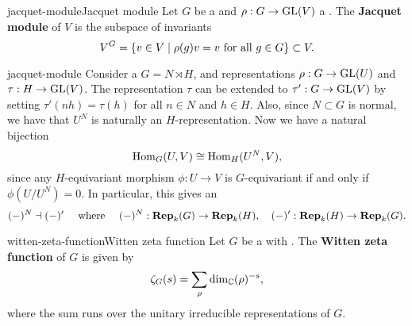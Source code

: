 \begin{topic}{jacquet-module}{Jacquet module}
    Let $G$ be a  and $\rho : G \to \textup{GL}(V)$ a . The \textbf{Jacquet module} of $V$ is the subspace of invariants
    \[ V^G = \{ v \in V \mid \rho(g) v = v \textup{ for all } g \in G \} \subset V . \]
\end{topic}

\begin{example}{jacquet-module}
    Consider a  $G = N \rtimes H$, and representations $\rho : G \to \textup{GL}(U)$ and $\tau : H \to \textup{GL}(V)$. The representation $\tau$ can be extended to $\tau' : G \to \textup{GL}(V)$ by setting $\tau'(nh) = \tau(h)$ for all $n \in N$ and $h \in H$. Also, since $N \subset G$ is normal, we have that $U^N$ is naturally an $H$-representation. Now we have a natural bijection
    \[ \operatorname{Hom}_G(U, V) \cong \operatorname{Hom}_H(U^N, V) , \]
    since any $H$-equivariant morphism $\phi : U \to V$ is $G$-equivariant if and only if $\phi(U/U^N) = 0$. In particular, this gives an 
    \[ (-)^N \dashv (-)' \quad \textup{ where } \quad (-)^N : \textbf{Rep}_k(G) \to \textbf{Rep}_k(H), \quad (-)' : \textbf{Rep}_k(H) \to \textbf{Rep}_k(G) . \]
\end{example}

\begin{topic}{witten-zeta-function}{Witten zeta function}
    Let $G$ be a   with  . The \textbf{Witten zeta function} of $G$ is given by
    \[ \zeta_G(s) = \sum_{\rho} \dim_{\mathbb{C}} (\rho)^{-s} , \]
    where the sum runs over the unitary irreducible representations of $G$.
\end{topic}

